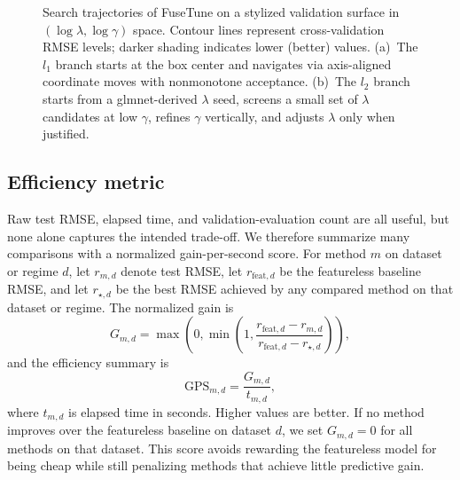 \documentclass[pdflatex,iicol,sn-mathphys-num]{sn-jnl}
\newcommand{\method}{\textsc{FuseTune}}
\def\textsc#1{#1}%
\def\texttt#1{#1}%
\def\method{FuseTune}%
\def\ell{l}%
\begin{document}
\begin{figure}[t]
\caption{Search trajectories of \method{} on a stylized validation surface in $(\log\lambda,\log\gamma)$ space. Contour lines represent cross-validation RMSE levels; darker shading indicates lower (better) values. (a)~The $\ell_1$ branch starts at the box center and navigates via axis-aligned coordinate moves with nonmonotone acceptance. (b)~The $\ell_2$ branch starts from a \texttt{glmnet}-derived $\lambda$ seed, screens a small set of $\lambda$ candidates at low $\gamma$, refines $\gamma$ vertically, and adjusts $\lambda$ only when justified.}
\label{fig:concept}
\end{figure}

\subsection{Efficiency metric}
Raw test RMSE, elapsed time, and validation-evaluation count are all useful, but none alone captures the intended trade-off. We therefore summarize many comparisons with a normalized gain-per-second score. For method \(m\) on dataset or regime \(d\), let \(r_{m,d}\) denote test RMSE, let \(r_{\mathrm{feat},d}\) be the featureless baseline RMSE, and let \(r_{\star,d}\) be the best RMSE achieved by any compared method on that dataset or regime. The normalized gain is
\begin{equation}
G_{m,d} =
\max\!\left(
0,
\min\!\left(
1,
\frac{r_{\mathrm{feat},d} - r_{m,d}}{r_{\mathrm{feat},d} - r_{\star,d}}
\right)
\right),
\label{eq:normalized_gain}
\end{equation}
and the efficiency summary is
\begin{equation}
\mathrm{GPS}_{m,d} = \frac{G_{m,d}}{t_{m,d}},
\label{eq:gain_per_second}
\end{equation}
where \(t_{m,d}\) is elapsed time in seconds. Higher values are better. If no method improves over the featureless baseline on dataset \(d\), we set \(G_{m,d}=0\) for all methods on that dataset. This score avoids rewarding the featureless model for being cheap while still penalizing methods that achieve little predictive gain.
\end{document}
